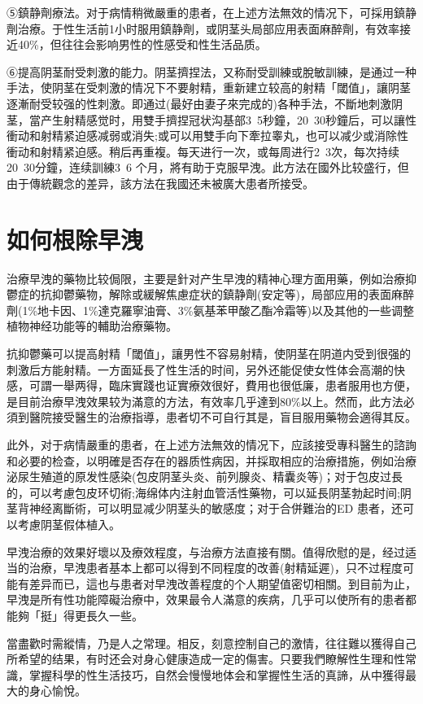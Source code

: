 \documentclass[12pt,UTF8]{ctexbook}
\begin{document}
⑤鎮静劑療法。对于病情稍微嚴重的患者，在上述方法無效的情况下，可採用鎮静劑治療。于性生活前1小时服用鎮静劑，或阴茎头局部应用表面麻醉劑，有效率接近40\%，但往往会影响男性的性感受和性生活品质。

⑥提高阴茎耐受刺激的能力。阴茎擠捏法，又称耐受訓練或脫敏訓練，是通过一种手法，使阴茎在受刺激的情况下不要射精，重新建立较高的射精「閾值」，讓阴茎逐漸耐受较强的性刺激。即通过(最好由妻子來完成的)各种手法，不斷地刺激阴茎，當产生射精感觉时，用雙手擠捏冠状沟基部3~5秒鐘，20~30秒鐘后，可以讓性衝动和射精紧迫感减弱或消失;或可以用雙手向下牽拉睾丸，也可以减少或消除性衝动和射精紧迫感。稍后再重複。每天进行一次，或每周进行2~3次，每次持续20~30分鐘，连续訓練3~6 个月，將有助于克服早洩。此方法在國外比较盛行，但由于傳統觀念的差异，該方法在我國还未被廣大患者所接受。

\section{如何根除早洩}

治療早洩的藥物比较侷限，主要是針对产生早洩的精神心理方面用藥，例如治療抑鬱症的抗抑鬱藥物，解除或緩解焦慮症状的鎮静劑(安定等)，局部应用的表面麻醉劑(1\%地卡因、1\%達克羅寧油膏、3\%氨基苯甲酸乙酯冷霜等)以及其他的一些调整植物神经功能等的輔助治療藥物。

抗抑鬱藥可以提高射精「閾值」，讓男性不容易射精，使阴茎在阴道内受到很强的刺激后方能射精。一方面延長了性生活的时间，另外还能促使女性体会高潮的快感，可謂一舉两得，臨床實踐也证實療效很好，費用也很低廉，患者服用也方便，是目前治療早洩效果较为滿意的方法，有效率几乎達到80\%以上。然而，此方法必須到醫院接受醫生的治療指導，患者切不可自行其是，盲目服用藥物会適得其反。

此外，对于病情嚴重的患者，在上述方法無效的情况下，应該接受專科醫生的諮詢和必要的检查，以明確是否存在的器质性病因，并採取相应的治療措施，例如治療泌尿生殖道的原发性感染(包皮阴茎头炎、前列腺炎、精囊炎等)；对于包皮过長的，可以考慮包皮环切術;海绵体内注射血管活性藥物，可以延長阴茎勃起时间;阴茎背神经离斷術，可以明显减少阴茎头的敏感度；对于合併難治的ED 患者，还可以考慮阴茎假体植入。

早洩治療的效果好壞以及療效程度，与治療方法直接有關。值得欣慰的是，经过适当的治療，早洩患者基本上都可以得到不同程度的改善(射精延遲)，只不过程度可能有差异而已，這也与患者对早洩改善程度的个人期望值密切相關。到目前为止，早洩是所有性功能障礙治療中，效果最令人滿意的疾病，几乎可以使所有的患者都能夠「挺」得更長久一些。

當盡歡时需縱情，乃是人之常理。相反，刻意控制自己的激情，往往難以獲得自己所希望的结果，有时还会对身心健康造成一定的傷害。只要我們瞭解性生理和性常識，掌握科學的性生活技巧，自然会慢慢地体会和掌握性生活的真諦，从中獲得最大的身心愉悅。
\end{document}
